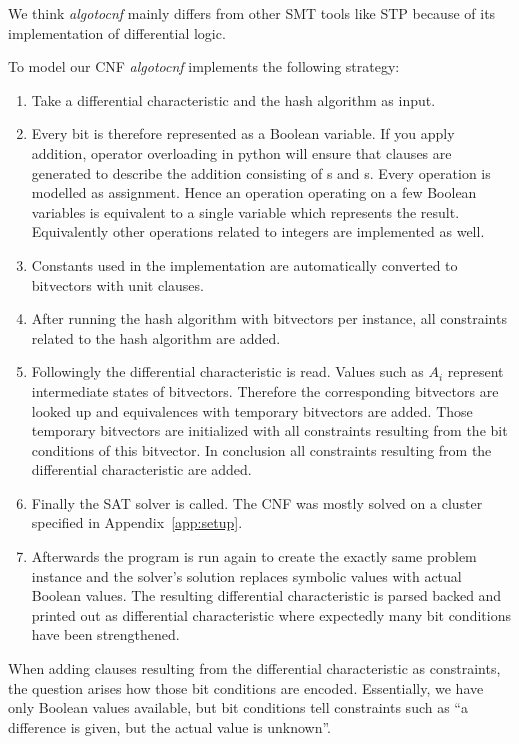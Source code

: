 We think \emph{algotocnf} mainly differs from other SMT tools like STP
because of its implementation of differential logic.

To model our CNF \emph{algotocnf} implements the following strategy:
\begin{enumerate}
  \item Take a differential characteristic and the hash algorithm as input.
  \item Every bit is therefore represented as a Boolean variable.
    If you apply addition, operator overloading in python will ensure
    that clauses are generated to describe the addition consisting of
    s and s. Every operation is modelled as assignment.
    Hence an operation operating on a few Boolean variables is equivalent
    to a single variable which represents the result.
    Equivalently other operations related to integers are implemented as well.
  \item Constants used in the implementation are automatically converted
    to bitvectors with unit clauses.
  \item After running the hash algorithm with bitvectors per instance,
    all constraints related to the hash algorithm are added.
  \item Followingly the differential characteristic is read. Values such as $A_i$
    represent intermediate states of bitvectors. Therefore the corresponding bitvectors
    are looked up and equivalences with temporary bitvectors are added.
    Those temporary bitvectors are initialized with all constraints resulting from
    the bit conditions of this bitvector.
    In conclusion all constraints resulting from the differential characteristic are added.
  \item Finally the SAT solver is called. The CNF was mostly solved on a cluster
    specified in Appendix~\ref{app:setup}.
  \item Afterwards the program is run again to
    create the exactly same problem instance and the solver's solution replaces
    symbolic values with actual Boolean values. The resulting differential
    characteristic is parsed backed and printed out as differential characteristic
    where expectedly many bit conditions have been strengthened.
\end{enumerate}

When adding clauses resulting from
the differential characteristic as constraints, the question arises how those
bit conditions are encoded. Essentially, we have only Boolean values available,
but bit conditions tell constraints such as \enquote{a difference is given,
but the actual value is unknown}.

